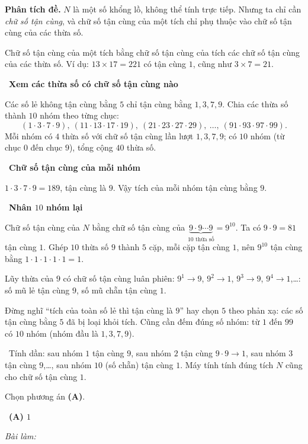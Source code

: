 \documentclass[11pt]{article}
\newif\ifsol \solfalse
\providecommand{\AnsWord}{Đáp số}
\newcommand{\ans}[1]{\par\smallskip{\bfseries\color{tmGreen!88!black}\AnsWord:}\ {\bfseries\color{AnsRed}#1}\par}
\newcommand{\probsol}[1]{%
  \begin{lrbox}{\solmeasure}\begin{minipage}{\dimexpr\linewidth-24pt\relax}#1\end{minipage}\end{lrbox}%
  \ifsol
    \begin{solbox}#1\end{solbox}%
  \else
    \setlength{\solht}{\dimexpr\ht\solmeasure+\dp\solmeasure+0.85cm\relax}%
    \ifdim\solht<1.35cm\setlength{\solht}{1.35cm}\fi
    \ifdim\solht>\StudentMaxWork\setlength{\solht}{\StudentMaxWork}\fi
    \begin{tcolorbox}[colback=white,colframe=Line,boxrule=0.8pt,arc=5pt,
      left=8pt,right=8pt,top=4pt,bottom=4pt,height=\solht]{\footnotesize\color{Slate}\itshape\WorkWord}\end{tcolorbox}%
  \fi}
\newlength{\StudentMaxWork}\setlength{\StudentMaxWork}{7.5cm}
\newcommand{\step}[2]{\par\smallskip\noindent{\bfseries\color{tmBlue!85!black}\StepWord~#1.}\ {\bfseries #2}\par\nopagebreak}
\newcommand{\verify}[1]{\par\smallskip\noindent{\bfseries\color{tmGreen!80!black}\faCheckCircle\ \CheckWord}\ #1\par}
\def\WorkWord{Bài làm:}
\def\AnsWord{Đáp số}
\def\StepWord{Bước}
\def\CheckWord{Thử lại:}
\begin{document}
\probsol{
\textbf{Phân tích đề.} $N$ là một số khổng lồ, không thể tính trực tiếp. Nhưng ta chỉ cần \emph{chữ số tận cùng}, và chữ số tận cùng của một tích chỉ phụ thuộc vào chữ số tận cùng của các thừa số.

\begin{recallbox}Chữ số tận cùng của một tích bằng chữ số tận cùng của tích các chữ số tận cùng của các thừa số. Ví dụ: $13\times 17=221$ có tận cùng $1$, cũng như $3\times 7=21$.\end{recallbox}

\step{1}{Xem các thừa số có chữ số tận cùng nào}
Các số lẻ không tận cùng bằng $5$ chỉ tận cùng bằng $1,3,7,9$. Chia các thừa số thành $10$ nhóm theo từng chục:
\[(1\cdot3\cdot7\cdot9),\ (11\cdot13\cdot17\cdot19),\ (21\cdot23\cdot27\cdot29),\ \dots,\ (91\cdot93\cdot97\cdot99).\]
Mỗi nhóm có $4$ thừa số với chữ số tận cùng lần lượt $1,3,7,9$; có $10$ nhóm (từ chục $0$ đến chục $9$), tổng cộng $40$ thừa số.

\step{2}{Chữ số tận cùng của mỗi nhóm}
$1\cdot3\cdot7\cdot9=189$, tận cùng là $9$. Vậy tích của mỗi nhóm tận cùng bằng $9$.

\step{3}{Nhân $10$ nhóm lại}
Chữ số tận cùng của $N$ bằng chữ số tận cùng của $\underbrace{9\cdot 9\cdots 9}_{10\text{ thừa số}}=9^{10}$. Ta có $9\cdot 9=81$ tận cùng $1$. Ghép $10$ thừa số $9$ thành $5$ cặp, mỗi cặp tận cùng $1$, nên $9^{10}$ tận cùng bằng $1\cdot1\cdot1\cdot1\cdot1=1$.

\begin{tipbox}Lũy thừa của $9$ có chữ số tận cùng luân phiên: $9^1\to 9$, $9^2\to 1$, $9^3\to 9$, $9^4\to 1$,\dots: số mũ lẻ tận cùng $9$, số mũ chẵn tận cùng $1$.\end{tipbox}

\begin{warnbox}Đừng nghĩ ``tích của toàn số lẻ thì tận cùng là $9$'' hay chọn $5$ theo phản xạ: các số tận cùng bằng $5$ đã bị loại khỏi tích. Cũng cần đếm đúng số nhóm: từ $1$ đến $99$ có $10$ nhóm (nhóm đầu là $1,3,7,9$).\end{warnbox}

\verify{Tính dần: sau nhóm $1$ tận cùng $9$, sau nhóm $2$ tận cùng $9\cdot9\to1$, sau nhóm $3$ tận cùng $9$,\dots, sau nhóm $10$ (số chẵn) tận cùng $1$. Máy tính tính đúng tích $N$ cũng cho chữ số tận cùng $1$.}
Chọn phương án \textbf{(A)}.
\ans{(A) $1$}
}
\end{document}
